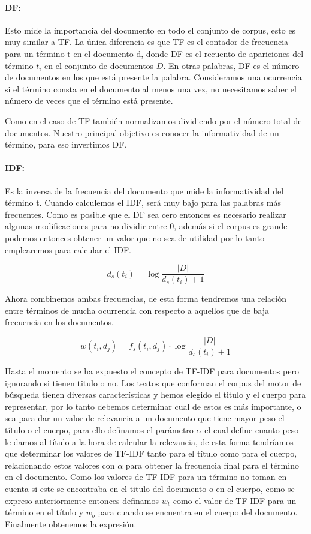 \documentclass[runningheads,a4paper]{llncs}
\begin{document}
\paragraph*{DF:} Esto mide la importancia del documento en todo el conjunto de corpus, esto es muy similar a TF. La única diferencia es que TF es el contador de frecuencia para un término t en el documento d, donde DF es el recuento de apariciones del término $t_i$ en el conjunto de documentos $D$. En otras palabras, DF es el número de documentos en los que está presente la palabra. Consideramos una ocurrencia si el término consta en el documento al menos una vez, no necesitamos saber el número de veces que el término está presente. 

Como en el caso de TF también normalizamos dividiendo por el número total de documentos. Nuestro principal objetivo es conocer la informatividad de un término, para eso invertimos DF.

\paragraph*{IDF:} Es la inversa de la frecuencia del documento que mide la informatividad del término t. Cuando calculemos el IDF, será muy bajo para las palabras más frecuentes. Como es posible que el DF sea cero entonces es necesario realizar algunas modificaciones para no dividir entre 0, además si el corpus es grande podemos entonces obtener un valor que no sea de utilidad por lo tanto emplearemos para calcular el IDF.

\begin{equation}
	\overline{d}_s(t_i) = \log{\frac{|D|}{d_s(t_i) + 1}}
\end{equation}

Ahora combinemos ambas frecuencias, de esta forma tendremos una relación entre términos de mucha ocurrencia con respecto a aquellos que de baja frecuencia en los documentos.

\begin{equation}
	w(t_i, d_j) = f_s(t_i, d_j) \cdot \log{\frac{|D|}{d_s(t_i) + 1}}
\end{equation}

Hasta el momento se ha expuesto el concepto de TF-IDF para documentos pero ignorando si tienen titulo o no. Los textos que conforman el corpus del motor de búsqueda tienen diversas características y hemos elegido el titulo y el cuerpo para representar, por lo tanto debemos determinar cual de estos es más importante, o sea para dar un valor de relevancia a un documento que tiene mayor peso el título o el cuerpo, para ello definamos el parámetro $\alpha$ el cual define cuanto peso le damos al título a la hora de calcular la relevancia, de esta forma tendríamos que determinar los valores de TF-IDF tanto para el título como para el cuerpo, relacionando estos valores con $\alpha$ para obtener la frecuencia final para el término en el documento. Como los valores de TF-IDF para un término no toman en cuenta si este se encontraba en el titulo del documento o en el cuerpo, como se expreso anteriormente entonces definamos $w_t$ como el valor de TF-IDF para un término en el título y $w_b$ para cuando se encuentra en el cuerpo del documento. Finalmente obtenemos la expresión.
\end{document}
